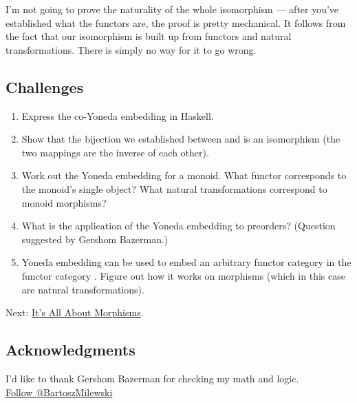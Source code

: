 I'm not going to prove the naturality of the whole isomorphism --- after
you've established what the functors are, the proof is pretty
mechanical. It follows from the fact that our isomorphism is built up
from functors and natural transformations. There is simply no way for it
to go wrong.

\subsection{Challenges}\label{challenges}

\begin{enumerate}
\tightlist
\item
  Express the co-Yoneda embedding in Haskell.
\item
  Show that the bijection we established between  and
   is an isomorphism (the two mappings are the inverse of
  each other).
\item
  Work out the Yoneda embedding for a monoid. What functor corresponds
  to the monoid's single object? What natural transformations correspond
  to monoid morphisms?
\item
  What is the application of the  Yoneda embedding to
  preorders? (Question suggested by Gershom Bazerman.)
\item
  Yoneda embedding can be used to embed an arbitrary functor category
  \code{{[}C,\ D{]}} in the functor category
  \code{{[}{[}C,\ D{]},\ Set{]}}. Figure out how it works on morphisms
  (which in this case are natural transformations).
\end{enumerate}

Next:
\href{https://bartoszmilewski.com/2015/11/17/its-all-about-morphisms/}{It's
All About Morphisms}.

\subsection{Acknowledgments}\label{acknowledgments}

I'd like to thank Gershom Bazerman for checking my math and logic.\\
\href{https://twitter.com/BartoszMilewski}{Follow @BartoszMilewski}

